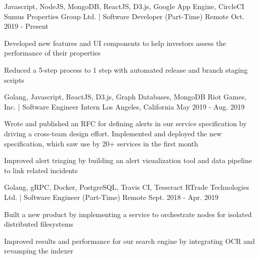 

\begin{cventries}

  \cventry
    {Javascript, NodeJS, MongoDB, ReactJS, D3.js, Google App Engine, CircleCI} %
    {Sumus Properties Group Ltd. | Software Developer (Part-Time)} %
    {Remote} %
    {Oct. 2019 - Present} %
    {
      \begin{cvitems} %
        \item {Developed new features and UI components to help investors assess the performance of their properties}
        \item {Reduced a 5-step process to 1 step with automated release and branch staging scripts}
      \end{cvitems}
    }

  \cventry
    {Golang, Javascript, ReactJS, D3.js, Graph Databases, MongoDB} %
    {Riot Games, Inc. | Software Engineer Intern} %
    {Los Angeles, California} %
    {May 2019 - Aug. 2019} %
    {
      \begin{cvitems} %
        \item {Wrote and published an RFC for defining alerts in our service specification by driving a cross-team design effort. Implemented and deployed the new specification, which saw use by 20+ services in the first month}
        \item {Improved alert triaging by building an alert visualization tool and data pipeline to link related incidents}
      \end{cvitems}
    }

  \cventry
    {Golang, gRPC, Docker, PostgreSQL, Travis CI, Tesseract} %
    {RTrade Technologies Ltd. | Software Engineer (Part-Time)} %
    {Remote} %
    {Sept. 2018 - Apr. 2019} %
    {
      \begin{cvitems} %
        \item {Built a new product by implementing a service to orchestrate nodes for isolated distributed filesystems}
        \item {Improved results and performance for our search engine by integrating OCR and revamping the indexer}
      \end{cvitems}
    }


\end{cventries}
